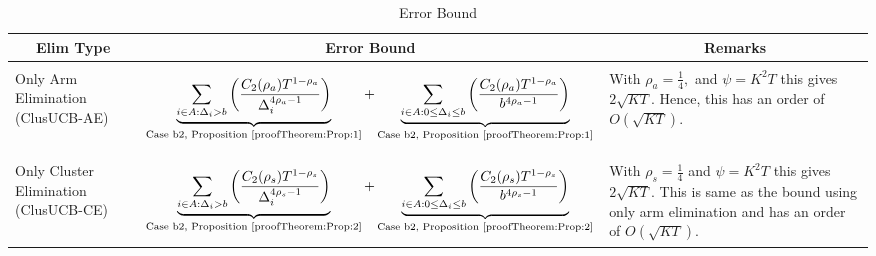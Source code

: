 \begin{table}
\caption{Error Bound}
\label{App:E:table:3}
\begin{center}
\begin{tabular}{p{1.4cm}p{10.3cm}p{3.5cm}}
\multicolumn{1}{c}{\bf Elim Type} &\multicolumn{1}{c}{\bf Error Bound} &\multicolumn{1}{c}{\bf Remarks} \\
\hline \\
Only Arm Elimination (ClusUCB-AE)	& \begin{align*}\underbrace{\sum_{i\in A:\Delta_{i} > b}\bigg(\dfrac{C_{2}(\rho_{a})T^{1-\rho_{a}}}{\Delta_{i}^{4\rho_{a} -1}} \bigg)}_{\text{Case b2, Proposition \ref{proofTheorem:Prop:1}}} + \underbrace{\sum_{i\in A:0\leq\Delta_{i}\leq b}\bigg( \dfrac{C_{2}(\rho_{a})T^{1-\rho_{a}}}{b^{4\rho_{a} -1}} \bigg)}_{\text{Case b2, Proposition \ref{proofTheorem:Prop:1}}}\end{align*}  & With $\rho_{a}=\frac{1}{4},$ and $\psi=K^{2}T$ this gives $2\sqrt{KT}$. Hence, this has an order of $O(\sqrt{KT})$.\\
\hline\\
Only Cluster Elimination	 (ClusUCB-CE) & \begin{align*} \underbrace{\sum_{i\in A:\Delta_{i} > b}\bigg(\dfrac{C_{2}(\rho_{s})T^{1-\rho_{s}}}{\Delta_{i}^{4\rho_{s} -1}} \bigg)}_{\text{Case b2, Proposition \ref{proofTheorem:Prop:2}}} +\underbrace{\sum_{i\in A:0\leq\Delta_{i}\leq b}\bigg(\dfrac{C_{2}(\rho_{s})T^{1-\rho_{s}}}{b^{4\rho_{s} -1}} \bigg)}_{\text{Case b2, Proposition \ref{proofTheorem:Prop:2}}} \end{align*} & With $\rho_{s}=\frac{1}{4}$ and $\psi=K^{2}T$ this gives $2\sqrt{KT}$. This is same as the bound using only arm elimination and has an order of $O(\sqrt{KT})$.\\

\end{tabular}
\end{center}
\end{table}
